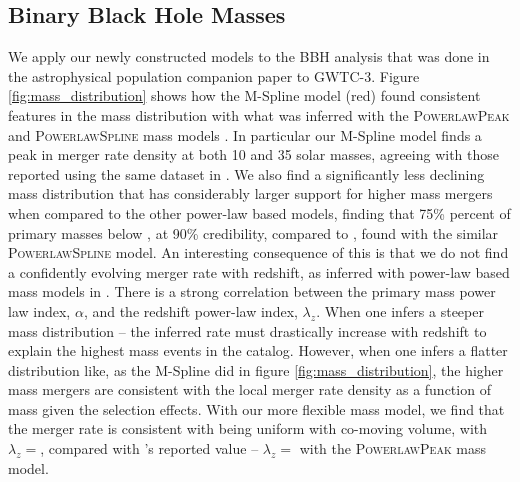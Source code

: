 \subsection{Binary Black Hole Masses} \label{sec:mass_dist}

We apply our newly constructed models to the BBH analysis that was done in the astrophysical population companion paper to GWTC-3. 
Figure \ref{fig:mass_distribution} shows how the M-Spline model (red) found consistent features in the mass distribution with 
what was inferred with the \textsc{PowerlawPeak} and \textsc{PowerlawSpline} mass models \cite{Talbot_2018,o3a_pop,Edelman_2022ApJ,o3b_astro_dist}. 
In particular our M-Spline model finds a peak in merger rate density at both 10 and 35 solar masses, agreeing with those reported using the same dataset in \citet{o3b_astro_dist}. 
We also find a significantly less declining mass distribution that has considerably larger support for higher mass mergers when 
compared to the other power-law based models, finding that 75\% percent of primary masses below \result{$\CIPlusMinus{\macros[MassDistribution][MSpline][m_75percentile]}$}, 
at 90\% credibility, compared to \result{$\CIPlusMinus{\macros[MassDistribution][PLSpline][m_75percentile]}$}, found with the similar \textsc{PowerlawSpline} model. 
An interesting consequence of this is that we do not find a confidently evolving merger rate with redshift, as inferred with power-law based mass models in \citet{o3b_astro_dist}. 
There is a strong correlation between the primary mass power law index, $\alpha$, and the redshift power-law index, $\lambda_z$. When one infers a steeper mass distribution -- 
the inferred rate must drastically increase with redshift to explain the highest mass events in the catalog. However, when one infers a 
flatter distribution like, as the M-Spline did in figure \ref{fig:mass_distribution}, the higher mass mergers are consistent with 
the local merger rate density as a function of mass given the selection effects. With our more flexible mass model, we find that the merger rate 
is consistent with being uniform with co-moving volume, with $\lambda_z = $\result{$\CIPlusMinus{\macros[MSplineIIDCompSpins][lamb]}$}, compared with 
\citet{o3b_astro_dist}'s reported value -- $\lambda_z = $\result{$\CIPlusMinus{\macros[PLPeak][lamb]}$} with the \textsc{PowerlawPeak} mass model.

